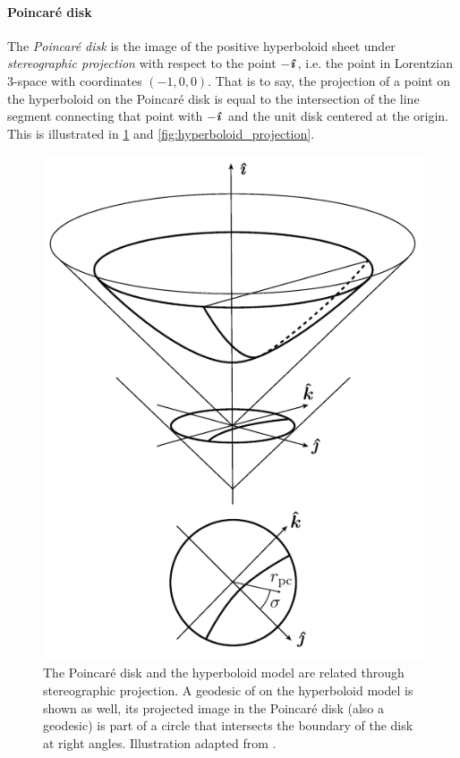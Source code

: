 \paragraph{Poincaré disk} The \emph{Poincaré disk} is the image of the positive hyperboloid sheet under \emph{stereographic projection} with respect to the point \(-\quati\), i.e. the point in Lorentzian 3-space with coordinates \((-1, 0, 0)\). That is to say, the projection of a point on the hyperboloid on the Poincaré disk is equal to the intersection of the line segment connecting that point with \(-\quati\) and the unit disk centered at the origin. This is illustrated in \cref{fig:poincare_disk} and \cref{fig:hyperboloid_projection}. 
\begin{figure}[ht!]
    \centering
    \includegraphics[scale=1]{media/other/poincare_disk-eps-converted-to}
    \caption{The Poincaré disk and the hyperboloid model are related through stereographic projection. A geodesic of on the hyperboloid model is shown as well, its projected image in the Poincaré disk (also a geodesic) is part of a circle that intersects the boundary of the disk at right angles. Illustration adapted from \citet{Balazs1986}.}
    \label{fig:poincare_disk}
\end{figure}

